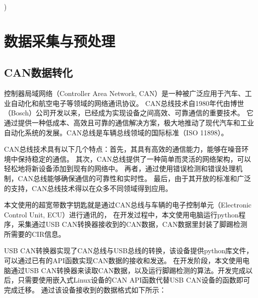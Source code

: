 )
\section{数据采集与预处理}
\subsection{CAN数据转化}
控制器局域网络（Controller Area Network, CAN）是一种被广泛应用于汽车、工业自动化和航空电子等领域的网络通讯协议。
CAN总线技术自1980年代由博世（Bosch）公司开发以来，已经成为实现设备之间高效、可靠通信的重要技术。
它通过提供一种低成本、高效且可靠的通信解决方案，极大地推动了现代汽车和工业自动化系统的发展。CAN总线是车辆总线领域的国际标准（ISO 11898）\cite{Chen2009ResearchOT}。

CAN总线技术具有以下几个特点：首先，其具有高效的通信能力，能够在噪音环境中保持稳定的通信。
其次，CAN总线提供了一种简单而灵活的网络架构，可以轻松地将新设备添加到现有的网络中。
再者，通过使用错误检测和错误处理机制，CAN总线能够确保通信的可靠性和实时性。
最后，由于其开放的标准和广泛的支持，CAN总线技术得以在众多不同领域得到应用。

本文使用的超宽带数字钥匙就是通过CAN总线与车辆的电子控制单元（Electronic Control Unit, ECU）进行通讯的，
在开发过程中，本文使用电脑运行python程序，采集通过USB CAN转换器接收到的CAN数据，CAN数据里封装了脚踢检测所需要的CIR信息。

USB CAN转换器实现了CAN总线与USB总线的转换，该设备提供python库文件，可以通过已有的API函数实现CAN数据的接收和发送。
在开发阶段，本文使用电脑通过USB CAN转换器来读取CAN数据，以及运行脚踢检测的算法。开发完成以后，只需要使用嵌入式Linux设备的CAN API函数代替USB CAN设备的函数即可完成迁移。
通过该设备接收到的数据格式如下所示：


